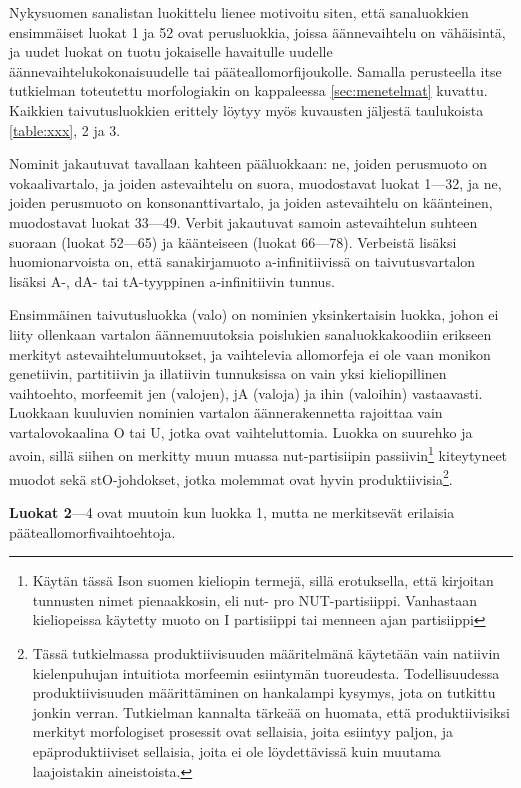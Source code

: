 \documentclass[free]{flammie}
\begin{document}
Nykysuomen sanalistan luokittelu lienee motivoitu siten, että sanaluokkien ensimmäiset luokat 1 ja 52 ovat perusluokkia, joissa äännevaihtelu on vähäisintä, ja
uudet luokat on tuotu jokaiselle havaitulle uudelle äännevaihtelukokonaisuudelle
tai pääteallomorfijoukolle. Samalla perusteella itse tutkielman toteutettu
morfologiakin on kappaleessa \ref{sec:menetelmat} kuvattu. Kaikkien taivutusluokkien erittely löytyy myös
kuvausten jäljestä taulukoista \ref{table:xxx}, 2 ja 3.

Nominit jakautuvat tavallaan kahteen pääluokkaan: ne, joiden perusmuoto on vokaalivartalo, ja joiden astevaihtelu on suora, muodostavat luokat 1—32, ja ne, joiden perusmuoto on konsonanttivartalo, ja joiden astevaihtelu on käänteinen, muodostavat luokat 33—49. Verbit jakautuvat samoin astevaihtelun suhteen suoraan
(luokat 52—65) ja käänteiseen (luokat 66—78). Verbeistä lisäksi huomionarvoista on, että sanakirjamuoto a-infinitiivissä on taivutusvartalon lisäksi A-, dA- tai
tA-tyyppinen a-infinitiivin tunnus.



Ensimmäinen taivutusluokka (valo) on nominien yksinkertaisin luokka, johon ei
liity ollenkaan vartalon äännemuutoksia poislukien sanaluokkakoodiin erikseen
merkityt astevaihtelumuutokset, ja vaihtelevia allomorfeja ei ole vaan monikon
genetiivin, partitiivin ja illatiivin tunnuksissa on vain yksi kieliopillinen
vaihtoehto, morfeemit jen (valojen), jA (valoja) ja ihin (valoihin) vastaavasti.
Luokkaan kuuluvien nominien vartalon äännerakennetta rajoittaa vain
vartalovokaalina O tai U, jotka ovat vaihteluttomia. Luokka on suurehko ja
avoin, sillä siihen on merkitty muun muassa nut-partisiipin
passiivin\footnote{Käytän tässä Ison suomen kieliopin \cite{hakulinen2008iso}
termejä, sillä erotuksella, että kirjoitan tunnusten nimet pienaakkosin, eli
nut- pro NUT-partisiippi. Vanhastaan kieliopeissa käytetty muoto on I
partisiippi tai menneen ajan partisiippi} kiteytyneet muodot sekä stO-johdokset,
jotka molemmat ovat hyvin produktiivisia\footnote{Tässä tutkielmassa
produktiivisuuden määritelmänä käytetään vain natiivin kielenpuhujan intuitiota
morfeemin esiintymän tuoreudesta. Todellisuudessa produktiivisuuden
määrittäminen on hankalampi kysymys, jota on tutkittu jonkin verran. Tutkielman
kannalta tärkeää on huomata, että produktiivisiksi merkityt morfologiset
prosessit ovat sellaisia, joita esiintyy paljon, ja epäproduktiiviset sellaisia,
joita ei ole löydettävissä kuin muutama laajoistakin aineistoista.}.

\textbf{Luokat 2}—4 ovat muutoin kun luokka 1, mutta ne merkitsevät erilaisia pääteallomorfivaihtoehtoja.
\end{document}
